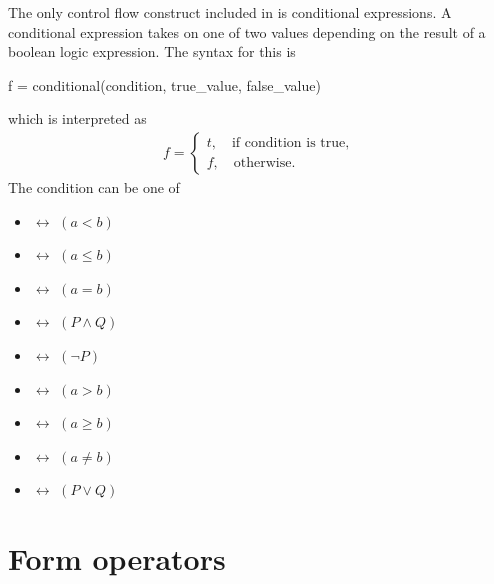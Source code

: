The only control flow construct included in \ufl{} is conditional
expressions. A conditional expression takes on one of two values depending
on the result of a boolean logic expression. The syntax for this is
\begin{uflcode}
f = conditional(condition, true_value, false_value)
\end{uflcode}
which is interpreted as
\begin{align}
f = \begin{cases}
    t, \quad \mbox{if condition is true}, \\
    f, \quad \mbox{otherwise}.
    \end{cases}
\end{align}
The condition can be one of
{\nolinenumbers\begin{multicols}{2}
\begin{itemize}
\item {} $\leftrightarrow$ $(a < b)$
\item {} $\leftrightarrow$ $(a \le b)$
\item {} $\leftrightarrow$ $(a = b)$
\item {} $\leftrightarrow$ $(P \land Q)$
\item {} $\leftrightarrow$ $(\lnot P)$
\end{itemize}
\begin{itemize}
\item {} $\leftrightarrow$ $(a > b)$
\item {} $\leftrightarrow$ $(a \ge b)$
\item {} $\leftrightarrow$ $(a \ne b)$
\item {} $\leftrightarrow$ $(P \lor Q)$
\end{itemize}
\end{multicols}}

\section{Form operators}
\label{ufl:sec:formtransformations}

